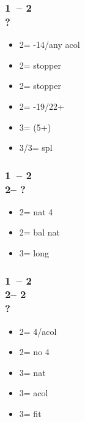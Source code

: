 \documentclass[12pt, a4paper]{report}
\begin{document}
\begin{bidpage}
\subsubsection*{1\clubs\ -- 2\clubs\\
                ?}
\begin{itemize}
    \item 2\diams = -14/any acol
    \item 2\hearts = stopper
    \item 2\spades = stopper
    \item 2\nt = -19/22+
    \item 3\clubs = \nat (5+)
    \item 3\diams/3\major = spl
\end{itemize}
\end{bidpage}

\begin{bidpage}
    \subsubsection*{1\clubs\ -- 2\clubs\\
                2\diams -- ?}
\begin{itemize}
    \item 2\major = nat 4\major
    \item 2\nt = bal nat \clubs
    \item 3\clubs = long \clubs
\end{itemize}
\end{bidpage}

\begin{bidpage}
\subsubsection*{1\clubs\ -- 2\clubs\\
                2\diams -- 2\hearts\\
                ?}
\begin{itemize}
    \item 2\spades = 4\spades/acol \spades
    \item 2\nt = no 4\major
    \item 3\clubs = nat \clubs
    \item 3\diams = acol
    \item 3\hearts = fit
\end{itemize}
\end{bidpage}
\end{document}
